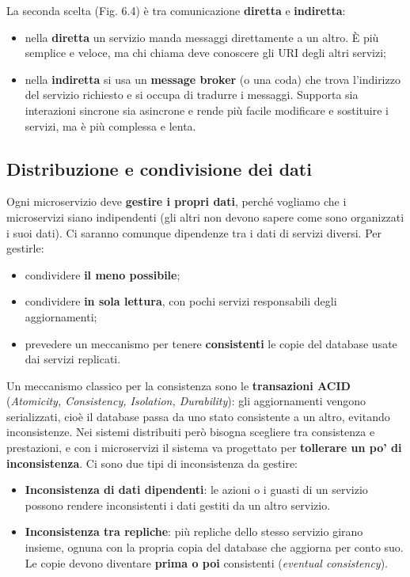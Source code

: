 La seconda scelta (Fig. 6.4) è tra comunicazione \textbf{diretta} e
\textbf{indiretta}:

\begin{itemize}
\tightlist
\item
  nella \textbf{diretta} un servizio manda messaggi direttamente a un
  altro. È più semplice e veloce, ma chi chiama deve conoscere gli URI
  degli altri servizi;
\item
  nella \textbf{indiretta} si usa un \textbf{message broker} (o una
  coda) che trova l'indirizzo del servizio richiesto e si occupa di
  tradurre i messaggi. Supporta sia interazioni sincrone sia asincrone e
  rende più facile modificare e sostituire i servizi, ma è più complessa
  e lenta.
\end{itemize}

\subsection{Distribuzione e condivisione dei
dati}\label{distribuzione-e-condivisione-dei-dati}

Ogni microservizio deve \textbf{gestire i propri dati}, perché vogliamo
che i microservizi siano indipendenti (gli altri non devono sapere come
sono organizzati i suoi dati). Ci saranno comunque dipendenze tra i dati
di servizi diversi. Per gestirle:

\begin{itemize}
\tightlist
\item
  condividere \textbf{il meno possibile};
\item
  condividere \textbf{in sola lettura}, con pochi servizi responsabili
  degli aggiornamenti;
\item
  prevedere un meccanismo per tenere \textbf{consistenti} le copie del
  database usate dai servizi replicati.
\end{itemize}

Un meccanismo classico per la consistenza sono le \textbf{transazioni
ACID} (\emph{Atomicity, Consistency, Isolation, Durability}): gli
aggiornamenti vengono serializzati, cioè il database passa da uno stato
consistente a un altro, evitando inconsistenze. Nei sistemi distribuiti
però bisogna scegliere tra consistenza e prestazioni, e con i
microservizi il sistema va progettato per \textbf{tollerare un po' di
inconsistenza}. Ci sono due tipi di inconsistenza da gestire:

\begin{itemize}
\tightlist
\item
  \textbf{Inconsistenza di dati dipendenti}: le azioni o i guasti di un
  servizio possono rendere inconsistenti i dati gestiti da un altro
  servizio.
\item
  \textbf{Inconsistenza tra repliche}: più repliche dello stesso
  servizio girano insieme, ognuna con la propria copia del database che
  aggiorna per conto suo. Le copie devono diventare \textbf{prima o poi}
  consistenti (\emph{eventual consistency}).
\end{itemize}

